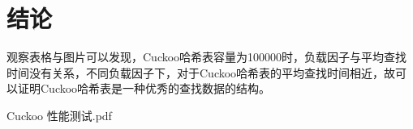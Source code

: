\documentclass[UTF8]{ctexart}
\begin{document}
\section{结论}
观察表格与图片可以发现，Cuckoo哈希表容量为100000时，负载因子与平均查找时间没有关系，不同负载因子下，对于Cuckoo哈希表的平均查找时间相近，故可以证明Cuckoo哈希表是一种优秀的查找数据的结构。

\clearpage
\begin{thebibliography}{99}
    Cuckoo 性能测试.pdf
\end{thebibliography}
\end{document}
